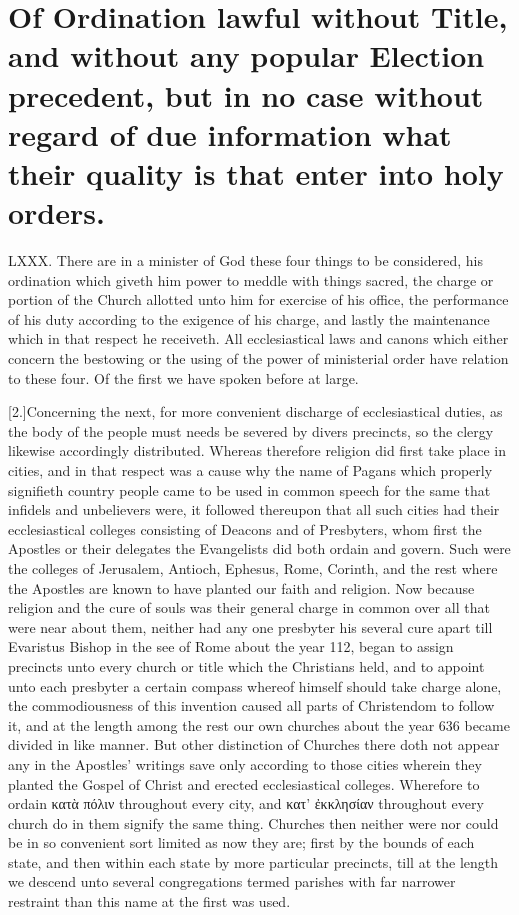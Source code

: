 \section*{Of Ordination lawful without Title, and without any popular Election precedent, but in no case without regard of due information what their quality is that enter into holy orders.}
LXXX. There are in a minister of God these four things to be considered, his ordination which giveth him power to meddle with things sacred, the charge or portion of the Church allotted unto him for exercise of his office, the performance of his duty according to the exigence of his charge, and lastly the maintenance which in that respect he receiveth. All ecclesiastical laws and canons which either concern the bestowing or the using of the power of ministerial order have relation to these four. Of the first we have spoken before at large.

[2.]Concerning the next, for more convenient discharge of ecclesiastical duties, as the body of the people must needs be severed by divers precincts, so the clergy likewise accordingly distributed. Whereas therefore religion did first take place in cities, and in that respect was a cause why the name of Pagans which properly signifieth country people came to be used in common speech for the same that infidels and unbelievers were, it followed thereupon that all such cities had their ecclesiastical colleges consisting of Deacons and of Presbyters, whom first the Apostles or their delegates the Evangelists did both ordain and govern. Such were the colleges of Jerusalem, Antioch, Ephesus, Rome, Corinth, and the rest where the Apostles are known to have planted  our faith and religion.
 Now because religion and the cure of souls was their general charge in common over all that were near about them, neither had any one presbyter his several cure apart till Evaristus Bishop in the see of Rome about the year 112, began to assign precincts unto every church or title which the Christians held, and to appoint unto each presbyter a certain compass whereof himself should take charge alone, the commodiousness of this invention caused all parts of Christendom to follow it, and at the length among the rest our own churches about the year 636 became divided in like manner. But other distinction of Churches there doth not appear any in the Apostles’ writings save only according to those cities wherein they planted the Gospel of Christ and erected ecclesiastical colleges. Wherefore to ordain κατὰ πόλιν throughout every city, and κατ’ ἐκκλησίαν throughout every church do in them signify the same thing. Churches then neither were nor could be in so convenient sort limited as now they are; first by the bounds of each state, and then within each state by more particular precincts, till at the length we descend unto several congregations termed parishes with far narrower restraint than this name at the first was used.

